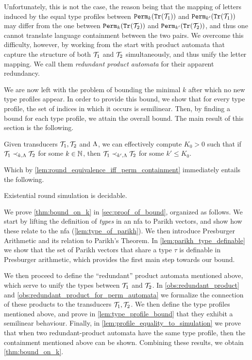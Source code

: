 Unfortunately, this is not the case, the reason being
that the mapping of letters induced by the equal type profiles between ${\mathtt{Perm}}_k({\mathtt{Tr}}(\mathcal{T}_1))$ and ${\mathtt{Perm}}_{k'}({\mathtt{Tr}}(\mathcal{T}_1))$ may differ from the one between ${\mathtt{Perm}}_k({\mathtt{Tr}}(\mathcal{T}_2))$ and ${\mathtt{Perm}}_{k'}({\mathtt{Tr}}(\mathcal{T}_2))$, and thus one cannot translate language containment between the two pairs. We overcome this difficulty, however, by working from the start with product automata that capture the structure of both $\mathcal{T}_1$ and $\mathcal{T}_2$ simultaneously, and thus unify the letter mapping. We call them \emph{redundant product automata} for their apparent redundancy. 

We are now left with the problem of bounding the minimal $k$ after which 
no new type profiles appear.
In order to provide this bound, we show that for every type profile, the set of indices in which it occurs is semilinear. Then, by finding a bound for each type profile, we attain the overall bound. 
The main result of this section is the following.
\begin{theorem}
\label{thm:bound_on_k}	
	Given transducers $\mathcal{T}_1,\mathcal{T}_2$ and $\Lambda$, we can effectively compute $K_0>0$ such that if $\mathcal{T}_1\prec_{k,\Lambda} \mathcal{T}_2$ for some $k\in \mathbb{N}$, then $\mathcal{T}_1\prec_{k',\Lambda} \mathcal{T}_2$ for some $k'\le K_0$.
\end{theorem}
Which by \autoref{lem:round_equivalence_iff_perm_containment} immediately entails the following.
\begin{corollary}
\label{cor:exist_k_decidable}
Existential round simulation is decidable.
\end{corollary}

We prove \autoref{thm:bound_on_k} in \autoref{sec:proof_of_bound}, organized as follows. We start by lifting the definition of \emph{types} in an \gls{nfa} to Parikh vectors, and show how these relate to the \gls{nfa} (\autoref{lem:type_of_parikh}). We then introduce Presburger Arithmetic and its relation to Parikh's Theorem. In \autoref{lem:parikh_type_definable} we show that the set of Parikh vectors that share a type $\tau$ is definable in Presburger arithmetic, which provides the first main step towards our bound.

We then proceed to define the ``redundant'' product automata mentioned above, which serve to unify the types between $\mathcal{T}_1$ and $\mathcal{T}_2$. In \autoref{obs:redundant_product} and \autoref{obs:redundant_product_for_perm_automata} we formalize the connection of these products to the transducers $\mathcal{T}_1,\mathcal{T}_2$. We then define the type profiles mentioned above, and prove in \autoref{lem:type_profile_bound} that they exhibit a semilinear behaviour. Finally, in \autoref{lem:profile_equality_to_simulation} we prove that when two redundant-product automata have the same type profile, then the containment mentioned above can be shown. Combining these results, we obtain \autoref{thm:bound_on_k}.

